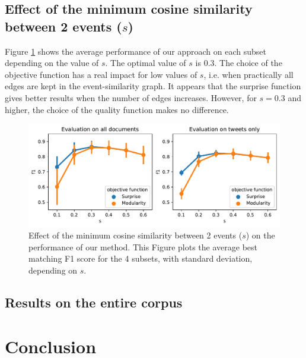 \subsection{Effect of the minimum cosine similarity between 2 events ($s$)}
Figure \ref{fig:louvain_macro_sim} shows the average performance of our approach on each subset depending on the value of $s$. The optimal value of $s$ is $0.3$. The choice of the objective function has a real impact for low values of $s$, i.e. when practically all edges are kept in the event-similarity graph. It appears that the surprise function gives better results when the number of edges increases. However, for $s=0.3$ and higher, the choice of the quality function makes no difference.

\begin{figure}
    \centering
    \includegraphics[width=1\textwidth]{figures/louvain_macro_sim.pdf}
    \caption[Effect of the minimum cosine similarity between 2 events on the performance of our method.]{Effect of the minimum cosine similarity between 2 events ($s$) on the performance of our method. This Figure plots the average best matching F1 score for the 4 subsets, with standard deviation, depending on $s$.}
    \label{fig:louvain_macro_sim}
\end{figure}
\subsection{Results on the entire corpus}
\label{Joint_results}

\section{Conclusion}
